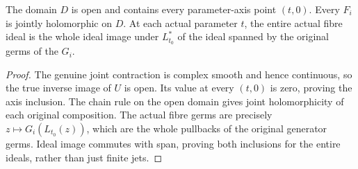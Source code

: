 \begin{theorem}
\label{hir:actual-axis-family-whole-ideal-dictionary}
\leanok
The domain $D$ is open and contains every parameter-axis point $(t,0)$.
Every $F_i$ is jointly holomorphic on $D$. At each actual parameter $t$,
the entire actual fibre ideal is the whole ideal image under $L_{t_0}^*$
of the ideal spanned by the original germs of the $G_i$.
\end{theorem}
\begin{proof}
The genuine joint contraction is complex smooth and hence continuous,
so the true inverse image of $U$ is open. Its value at every $(t,0)$ is
zero, proving the axis inclusion. The chain rule on the open domain gives
joint holomorphicity of each original composition. The actual fibre germs
are precisely $z\mapsto G_i(L_{t_0}(z))$, which are the whole pullbacks of
the original generator germs. Ideal image commutes with span, proving
both inclusions for the entire ideals, rather than just finite jets.
\end{proof}

